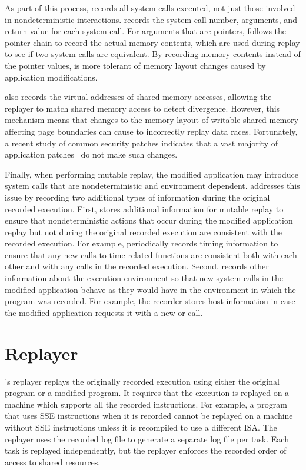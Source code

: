 As part of this process, {\dora} records all system calls executed, not just those
involved in nondeterministic interactions.  {\dora} records the
system call number, arguments, and return value for each system
call. For arguments that are pointers, {\dora} follows the pointer
chain to record the actual memory contents, which are used during
replay to see if two system calls are equivalent.  By recording memory
contents instead of the pointer values, {\dora} is more tolerant of
memory layout changes caused by application modifications.

{\dora} also records the virtual addresses of shared memory accesses,
allowing the replayer to match shared memory access to detect divergence.
However, this mechanism means that changes to the memory layout of
writable shared memory affecting page
boundaries can cause {\dora} to incorrectly replay data races.
Fortunately, a recent study of common security patches indicates that
a vast majority of application
patches~\cite{mreplay-feas} do not make such changes.

Finally, when performing mutable replay, the modified application
may introduce system calls that are nondeterministic and environment
dependent.  {\dora} addresses this issue by recording two
additional types of information during the original recorded
execution.  First, {\dora} stores additional
information for mutable replay to ensure that nondeterministic actions
that occur during the modified application replay but not during the
original recorded execution are consistent with the recorded
execution.  For example, {\dora} periodically
records timing information to ensure that any new calls to time-related
functions are consistent both with each other and with any calls in the recorded execution.
Second, {\dora} records other information about the execution environment so
that new system calls in the modified application behave as they would have in
the environment in which the program was recorded.
For example, the recorder stores
host information in case the modified application requests it with a new
 or  call.
\section{Replayer}
\label{dora:sec:replayer}

{\dora}'s replayer replays the originally
recorded execution using either the original program or a modified
program. It requires that the execution is replayed on a machine which
supports all the recorded instructions. For example, a program that
uses SSE instructions when it is recorded cannot be replayed on a
machine without SSE instructions unless it is recompiled to use a different
ISA.  The replayer uses the recorded log file to generate a separate
log file per task.  Each task is replayed independently, but the
replayer enforces the recorded order of access to shared resources.  

